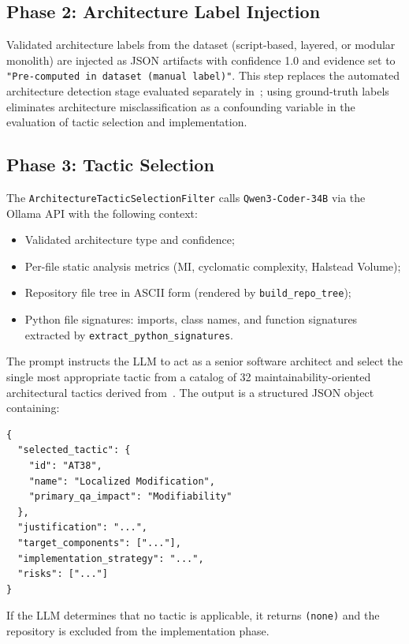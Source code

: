 \documentclass[sigconf,review,anonymous]{acmart}
\begin{document}
\subsection{Phase 2: Architecture Label Injection}

Validated architecture labels from the dataset (script-based, layered, or modular monolith) are injected as JSON artifacts with confidence 1.0 and evidence set to \texttt{"Pre-computed in dataset (manual label)"}. This step replaces the automated architecture detection stage evaluated separately in~\cite{chertkov_2026_20051151}; using ground-truth labels eliminates architecture misclassification as a confounding variable in the evaluation of tactic selection and implementation.

\subsection{Phase 3: Tactic Selection}
\label{sec:impl_tactic_selection}

The \texttt{ArchitectureTacticSelectionFilter} calls \texttt{Qwen3-Coder-34B} via the Ollama API with the following context:
\begin{itemize}[nosep]
    \item Validated architecture type and confidence;
    \item Per-file static analysis metrics (MI, cyclomatic complexity, Halstead Volume);
    \item Repository file tree in ASCII form (rendered by \texttt{build\_repo\_tree});
    \item Python file signatures: imports, class names, and function signatures extracted by \texttt{extract\_python\_signatures}.
\end{itemize}

The prompt instructs the LLM to act as a senior software architect and select the single most appropriate tactic from a catalog of 32 maintainability-oriented architectural tactics derived from~\cite{marquez2022architectural}. The output is a structured JSON object containing:
\begin{verbatim}
{
  "selected_tactic": {
    "id": "AT38",
    "name": "Localized Modification",
    "primary_qa_impact": "Modifiability"
  },
  "justification": "...",
  "target_components": ["..."],
  "implementation_strategy": "...",
  "risks": ["..."]
}
\end{verbatim}

If the LLM determines that no tactic is applicable, it returns \texttt{(none)} and the repository is excluded from the implementation phase.
\end{document}
